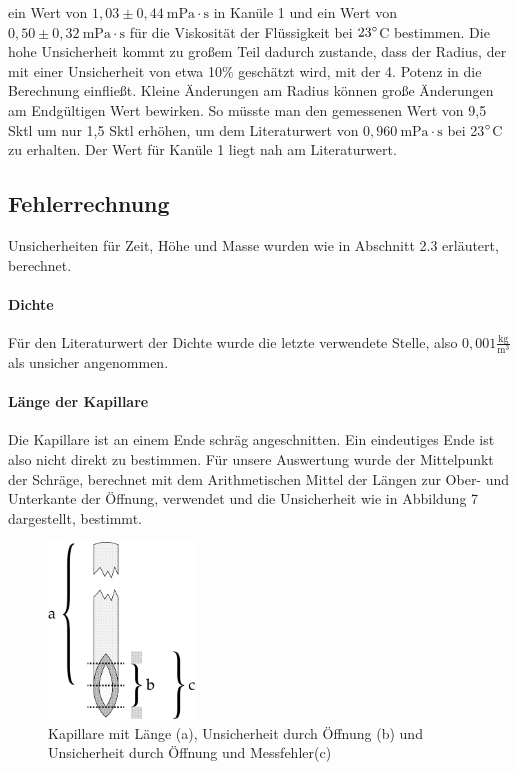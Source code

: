 \documentclass{article}
\begin{document}
ein Wert von $1,03 \pm 0,44 \ \textrm{mPa} \cdot \textrm{s}$ in Kanüle 1 und ein Wert von $0,50 \pm 0,32 \ \textrm{mPa} \cdot \textrm{s}$ für die Viskosität der Flüssigkeit bei $23 \degree$C bestimmen. Die hohe Unsicherheit kommt zu großem Teil dadurch zustande, dass der Radius, der mit einer Unsicherheit von etwa 10$\%$ geschätzt wird, mit der 4. Potenz in die Berechnung einfließt. Kleine Änderungen am Radius können große Änderungen am Endgültigen Wert bewirken. So müsste man den gemessenen Wert von 9,5 Sktl um nur 1,5 Sktl erhöhen, um dem Literaturwert von $0,960 \ \textrm{mPa}\cdot \textrm{s}$ \cite{9} bei 23$ \degree$C zu erhalten. Der Wert für Kanüle 1 liegt nah am Literaturwert.
\subsection{Fehlerrechnung}
Unsicherheiten für Zeit, Höhe und Masse wurden wie in Abschnitt 2.3 erläutert, berechnet.
\paragraph{Dichte} Für den Literaturwert der Dichte \cite{8} wurde die letzte verwendete Stelle, also $0,001\frac{\textrm{kg}}{\textrm{m}^3}$ als unsicher angenommen.
\paragraph{Länge der Kapillare} Die Kapillare ist an einem Ende schräg angeschnitten. Ein eindeutiges Ende ist also nicht direkt zu bestimmen. Für unsere Auswertung wurde der Mittelpunkt der Schräge, berechnet mit dem Arithmetischen Mittel der Längen zur Ober- und Unterkante der Öffnung, verwendet und die Unsicherheit wie in Abbildung 7 dargestellt, bestimmt.
\begin{figure}[H]
\centering
\includegraphics[width=110pt]{KapillareMasse.png}
\caption{Kapillare mit Länge (a), Unsicherheit durch Öffnung (b) und Unsicherheit durch Öffnung und Messfehler(c)}
\label{fig:length_eight_mouse}
\end{figure}
\noindent
\end{document}
